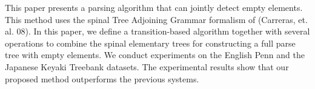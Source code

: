 This paper presents a parsing algorithm that can jointly detect empty elements. This method uses the spinal Tree Adjoining Grammar formalism of (Carreras, et. al. 08). In this paper, we define a transition-based algorithm together with several operations to combine the spinal elementary trees for constructing a full parse tree with empty elements. We conduct experiments on the English Penn and the Japanese Keyaki Treebank datasets. The experimental results show that our proposed method outperforms the previous systems.
